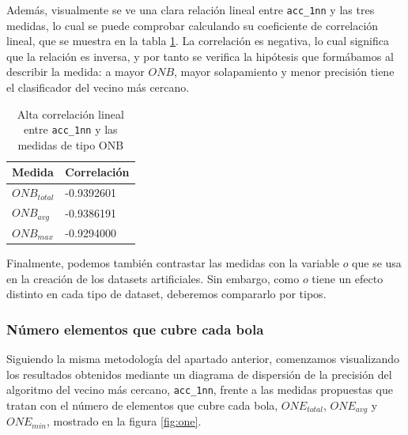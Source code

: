 \documentclass[a4paper,12pt]{report}
\theoremstyle{definition}
\begin{document}
Además, visualmente se ve una clara relación lineal entre \texttt{acc\_1nn} y las tres medidas, lo cual se puede comprobar calculando su coeficiente de correlación lineal, que se muestra en la tabla \ref{tab:onb}. La correlación es negativa, lo cual significa que la relación es inversa, y por tanto se verifica la hipótesis que formábamos al describir la medida: a mayor $ONB$, mayor solapamiento y menor precisión tiene el clasificador del vecino más cercano.

\begin{table}
  \centering
  \begin{tabular}{ l l }
    Medida & Correlación \\ \hline
    $ONB_{total}$ & -0.9392601 \\
    $ONB_{avg}$ & -0.9386191 \\
    $ONB_{max}$ & -0.9294000 \\
  \end{tabular}
  \caption{Alta correlación lineal entre \texttt{acc\_1nn} y las medidas de tipo ONB}
  \label{tab:onb}
\end{table}


Finalmente, podemos también contrastar las medidas con la variable $o$ que se usa en la creación de los datasets artificiales. Sin embargo, como $o$ tiene un efecto distinto en cada tipo de dataset, deberemos compararlo por tipos.

\subsubsection{Número elementos que cubre cada bola}

Siguiendo la misma metodología del apartado anterior, comenzamos visualizando los resultados obtenidos mediante un diagrama de dispersión de la precisión del algoritmo del vecino más cercano, \texttt{acc\_1nn}, frente a las medidas propuestas que tratan con el número de elementos que cubre cada bola, $ONE_{total}$, $ONE_{avg}$ y $ONE_{min}$, mostrado en la figura \ref{fig:one}.
\end{document}
